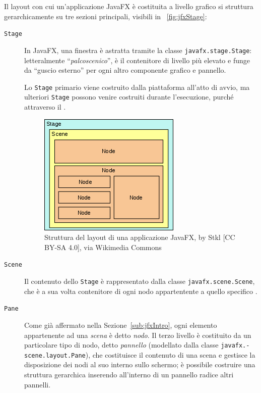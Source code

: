             Il layout con cui un'applicazione JavaFX è costituita a livello grafico si struttura gerarchicamente su tre sezioni principali, visibili in \figurename~\vref{fig:jfxStage}:

            \begin{description}
                \item[\texttt{Stage}]\label{itm:stg} In JavaFX, una finestra è astratta tramite la classe \texttt{javafx\dothyp stage\dothyp Stage}: letteralmente ``\emph{palcoscenico}'',  è il contenitore di livello più elevato e funge da ``guscio esterno'' per ogni altro componente grafico e pannello.

                Lo \texttt{Stage} primario viene costruito dalla piattaforma all'atto di avvio, ma ulteriori \texttt{Stage} possono venire costruiti durante l'esecuzione, purché attraverso il .

            \begin{figure}[htbp]
                \centering
                \includegraphics[scale=1]{img/Javafx-stage-scene-node}
                \caption{Struttura del layout di una applicazione JavaFX, by Stkl [CC BY-SA 4.0], via Wikimedia Commons}
                \label{fig:jfxStage}
            \end{figure}

                \item[\texttt{Scene}]\label{itm:scn} Il contenuto dello \texttt{Stage} è rappresentato dalla classe \texttt{javafx\dothyp scene\dothyp Scene}, che è a sua volta contenitore di ogni nodo appartentente a quello specifico .

                \item[\texttt{Pane}]\label{itm:pane} Come già affermato nella Sezione~\vref{sub:jfxIntro}, ogni elemento appartenente ad una \emph{scena} è detto \emph{nodo}. Il terzo livello è costituito da un particolare tipo di nodo, detto \emph{pannello} (modellato dalla classe \texttt{javafx\dothyp scene\dothyp layout\dothyp Pane}), che costituisce il contenuto di una scena e gestisce la disposizione dei nodi al suo interno sullo schermo; è possibile costruire una struttura gerarchica inserendo all'interno di un pannello radice altri pannelli.


\end{description}
